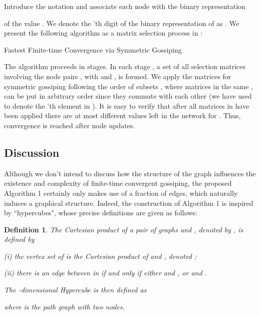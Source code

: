 \documentclass[a4paper, 11pt]{article}
\newtheorem{definition}{Definition}
\begin{document}
Introduce the notation  and associate each node  with the binary representation

of the value . We denote the 'th digit of the binary representation of  as . We present the following algorithm as a matrix selection process in :



\begin{algorithm}[htb]
\caption{Fastest Finite-time Convergence   via Symmetric Gossiping}
\label{alg:Framwork}
\begin{algorithmic}[1]
\STATE 
\FOR{}
    \STATE  
    \FOR{}
        \STATE 
        \STATE 
    \ENDFOR
\ENDFOR
\RETURN 
\end{algorithmic}
\end{algorithm}

The algorithm proceeds in  stages. In each stage , a set  of all selection matrices  involving the node pairs  ,  with  and , is formed.
We apply the matrices  for symmetric gossiping  following the order of subsets , where matrices in the same  ,  can be put in arbitrary order since they commute with each other (we have used  to denote the 'th element in ). It is easy to verify that after all matrices in  have been applied   there are at most  different values left in the network for .  Thus, convergence is reached after  node updates.




\subsection{Discussion} Although we don't intend to discuss how the structure of the graph influences the existence and complexity of finite-time convergent gossiping, the proposed Algorithm 1 certainly only makes use of a fraction of edges, which naturally induces a graphical structure. Indeed, the construction of Algorithm 1 is inspired by ``hypercubes", whose precise definitions are given as follows:

\medskip

\begin{definition}
The Cartesian product of  a pair of graphs  and , denoted by , is defined by

 (i) the  vertex set of  is the Cartesian product of  and , denoted  ;

  (ii) there is an edge between  in  if and only if either  and , or  and .

The  -dimensional Hypercube  is then  defined as

where  is the path graph with two nodes.
\end{definition}
\end{document}
